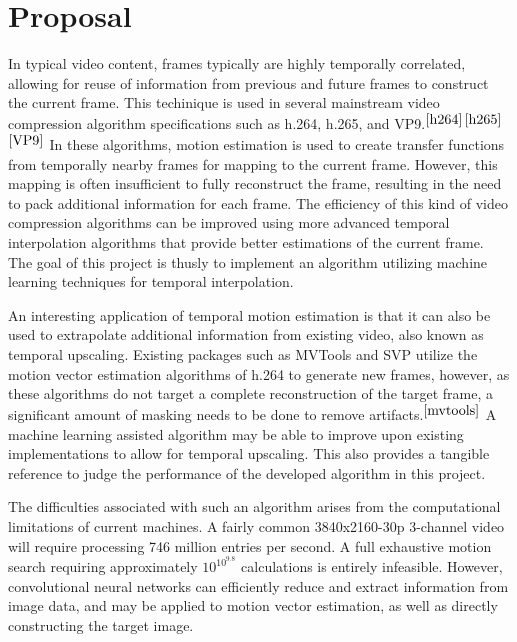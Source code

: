 \documentclass[twocolumn]{paper}
\begin{document}
\justify
\small
\section*{Proposal}
In typical video content, frames typically are highly temporally correlated, allowing for reuse of information from previous and future frames to construct the current frame. This techinique is used in several mainstream video compression algorithm specifications such as h.264, h.265, and VP9.$^{\cite{h264}}$$^{\cite{h265}}$$^{\cite{VP9}}$
In these algorithms, motion estimation is used to create transfer functions from temporally nearby frames for mapping to the current frame. However, this mapping is often insufficient to fully reconstruct the frame, resulting in the need to pack additional information for each frame. The efficiency of this kind of video compression algorithms can be improved using more advanced temporal interpolation algorithms that provide better estimations of the current frame. The goal of this project is thusly to implement an algorithm utilizing machine learning techniques for temporal interpolation.

An interesting application of temporal motion estimation is that it can also be used to extrapolate additional information from existing video, also known as temporal upscaling. Existing packages such as MVTools and SVP utilize the motion vector estimation algorithms of h.264 to generate new frames, however, as these algorithms do not target a complete reconstruction of the target frame, a significant amount of masking needs to be done to remove artifacts.$^{\cite{mvtools}}$ A machine learning assisted algorithm may be able to improve upon existing implementations to allow for temporal upscaling. This also provides a tangible reference to judge the performance of the developed algorithm in this project.

The difficulties associated with such an algorithm arises from the computational limitations of current machines. A fairly common 3840x2160-30p 3-channel video will require processing 746 million entries per second. A full exhaustive motion search requiring approximately $10^{10^{9.8}}$ calculations is entirely infeasible. However, convolutional neural networks can efficiently reduce and extract information from image data, and may be applied to motion vector estimation, as well as directly constructing the target image. 
\end{document}
